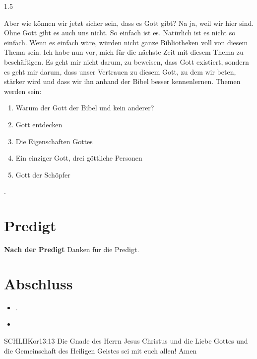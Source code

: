 \documentclass[fontsize=14pt]{../../inc/mybib}
\begin{document}
\begin{spacing}{1.5}
\begin{block}
        Aber wie können wir jetzt sicher sein, dass es Gott gibt? Na ja, weil wir hier sind. Ohne Gott gibt es auch uns nicht. So einfach ist es. Natürlich ist es nicht so einfach. Wenn es einfach wäre, würden nicht ganze Bibliotheken voll von diesem Thema sein. Ich habe nun vor, mich für die nächste Zeit mit diesem Thema zu beschäftigen. Es geht mir nicht darum, zu beweisen, dass Gott existiert, sondern es geht mir darum, dass unser Vertrauen zu diesem Gott, zu dem wir beten, stärker wird und dass wir ihn anhand der Bibel besser kennenlernen.
        Themen werden sein:
        \begin{enumerate}
            \item Warum der Gott der Bibel und kein anderer?
            \item Gott entdecken
            \item Die Eigenschaften Gottes
            \item Ein einziger Gott, drei göttliche Personen
            \item Gott der Schöpfer
        \end{enumerate}
        
    \end{block}
    \begin{block}[Ende]
    \end{block}
    .
\end{spacing}
\section{Predigt}
\textbf{Nach der Predigt}\newline
Danken für die Predigt.
\section{Abschluss}
\begin{itemize}
    \item [] .
    \item [] 
\end{itemize}
\begin{bibelbox}{SCHL}{IIKor}{13:13}
    Die Gnade des Herrn Jesus Christus und die Liebe Gottes und die Gemeinschaft des Heiligen Geistes sei mit euch allen! Amen
\end{bibelbox}
\end{document}
